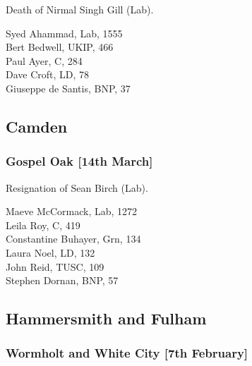 \documentclass[a4paper,openany,10pt]{book}
\begin{document}

Death of Nirmal Singh Gill (Lab).



Syed Ahammad, Lab, 1555\\
Bert Bedwell, UKIP, 466\\
Paul Ayer, C, 284\\
Dave Croft, LD, 78\\
Giuseppe de Santis, BNP, 37\\


\subsection*{Camden}

\subsubsection*{Gospel Oak \hspace*{\fill}\nolinebreak[1]%
\enspace\hspace*{\fill}
[14th March]}


Resignation of Sean Birch (Lab).



Maeve McCormack, Lab, 1272\\
Leila Roy, C, 419\\
Constantine Buhayer, Grn, 134\\
Laura Noel, LD, 132\\
John Reid, TUSC, 109\\
Stephen Dornan, BNP, 57\\


\subsection*{Hammersmith and Fulham}

\subsubsection*{Wormholt and White City \hspace*{\fill}\nolinebreak[1]%
\enspace\hspace*{\fill}
[7th February]}

\end{document}
